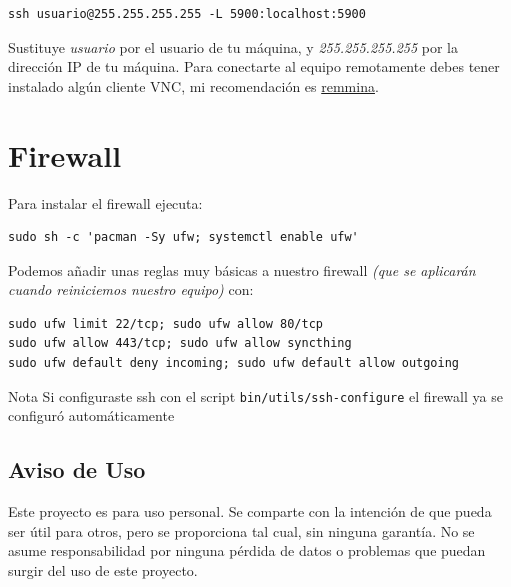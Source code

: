 \documentclass[12pt]{article}
\begin{document}
\begin{verbatim}
ssh usuario@255.255.255.255 -L 5900:localhost:5900
\end{verbatim}

Sustituye \emph{usuario} por el usuario de tu máquina, y \emph{255.255.255.255} por la dirección IP de tu máquina. Para conectarte al equipo remotamente debes tener instalado algún cliente VNC, mi recomendación es \href{https://github.com/FreeRDP/Remmina}{remmina}.

\section{Firewall}

Para instalar el firewall ejecuta:

\begin{verbatim}
sudo sh -c 'pacman -Sy ufw; systemctl enable ufw'
\end{verbatim}

Podemos añadir unas reglas muy básicas a nuestro firewall \emph{(que se aplicarán cuando reiniciemos nuestro equipo)} con:

\begin{verbatim}
sudo ufw limit 22/tcp; sudo ufw allow 80/tcp
sudo ufw allow 443/tcp; sudo ufw allow syncthing
sudo ufw default deny incoming; sudo ufw default allow outgoing
\end{verbatim}

\begin{mybox}{Nota}
	Si configuraste ssh con el script \texttt{bin/utils/ssh-configure} el firewall ya se configuró automáticamente
\end{mybox}

\subsection*{\centering Aviso de Uso}

Este proyecto es para uso personal. Se comparte con la intención de que pueda ser útil para otros, pero se proporciona tal cual, sin ninguna garantía. No se asume responsabilidad por ninguna pérdida de datos o problemas que puedan surgir del uso de este proyecto.
\end{document}
